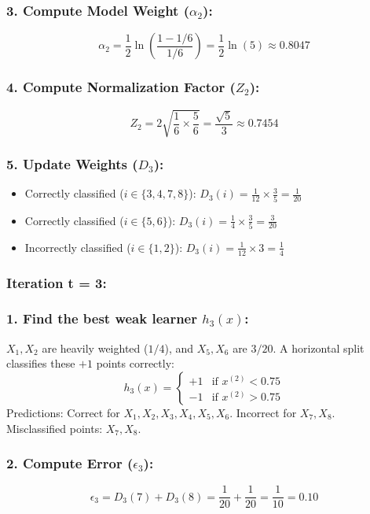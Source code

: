 \documentclass[twoside, 10pt]{article}
\begin{document}
\subsubsection*{3. Compute Model Weight ($\alpha_2$):}
\[
\alpha_2 = \frac{1}{2} \ln \left( \frac{1 - 1/6}{1/6} \right) = \frac{1}{2} \ln(5) \approx 0.8047
\]
\subsubsection*{4. Compute Normalization Factor ($Z_2$):}
\[
Z_2 = 2 \sqrt{\frac{1}{6} \times \frac{5}{6}} = \frac{\sqrt{5}}{3} \approx 0.7454
\]
\subsubsection*{5. Update Weights ($D_3$):}
\begin{itemize}
    \item Correctly classified ($i \in \{3, 4, 7, 8\}$): $D_3(i) = \frac{1}{12} \times \frac{3}{5} = \frac{1}{20}$
    \item Correctly classified ($i \in \{5, 6\}$): $D_3(i) = \frac{1}{4} \times \frac{3}{5} = \frac{3}{20}$
    \item Incorrectly classified ($i \in \{1, 2\}$): $D_3(i) = \frac{1}{12} \times 3 = \frac{1}{4}$
\end{itemize}
\subsubsection{Iteration t = 3:}
\subsubsection*{1. Find the best weak learner $h_3(x)$:}
$X_1, X_2$ are heavily weighted ($1/4$), and $X_5, X_6$ are $3/20$. A horizontal split classifies these $+1$ points correctly:
\[
h_3(x) = \begin{cases} 
+1 & \text{if } x^{(2)} < 0.75 \\ 
-1 & \text{if } x^{(2)} > 0.75 
\end{cases}
\]
Predictions: Correct for $X_1, X_2, X_3, X_4, X_5, X_6$. Incorrect for $X_7, X_8$. \\
Misclassified points: $X_7, X_8$.
\subsubsection*{2. Compute Error ($\epsilon_3$):}
\[
\epsilon_3 = D_3(7) + D_3(8) = \frac{1}{20} + \frac{1}{20} = \frac{1}{10} = 0.10
\]
\end{document}
